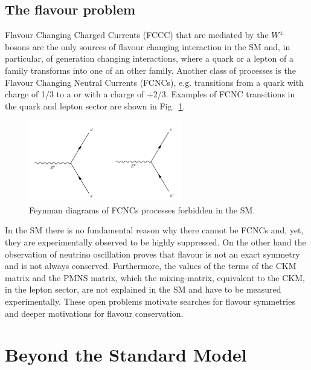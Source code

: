 \subsection{The flavour problem}

Flavour Changing Charged Currents (FCCC) that are mediated by the $W^\pm$ bosons are the only sources of flavour changing interaction in the SM and, in particular, of generation changing interactions, where a quark or a lepton of a family transforms
into one of an other family. Another class of processes is the Flavour Changing Neutral Currents (FCNCs), e.g. transitions from a
\bquark quark with charge of 1/3 to a \squark or \dquark with a charge of +2/3. Examples of FCNC transitions in the quark
and lepton sector are shown in Fig.~\ref{fig:neutr_curr}.
%
\begin{figure}[h!]
\centering 
\includegraphics[width=0.6\textwidth]{Introduction/figs/neutral_current_proc.png}
\caption{Feynman diagrams of FCNCs processes forbidden in the SM.}
\label{fig:neutr_curr}
\end{figure}
%
In the SM there is no fundamental reason why
there cannot be FCNCs and, yet, they are experimentally  observed to be highly suppressed.
On the other hand the observation of neutrino oscillation proves that flavour is not an exact symmetry and is not always
conserved. Furthermore, the values of the terms of the CKM matrix and the PMNS matrix,
which the mixing-matrix, equivalent to the CKM, in the lepton sector, are not explained in the SM
and have to be measured experimentally. These open problems motivate searches for flavour symmetries and 
deeper motivations for flavour conservation. 

\section{Beyond the Standard Model}

